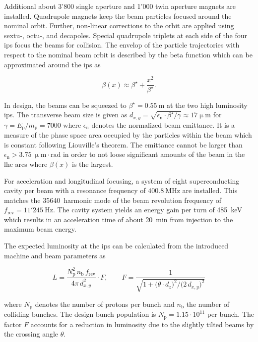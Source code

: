 Additional about 3'800 single aperture and 1'000 twin aperture magnets are installed. Quadrupole magnets keep the beam particles focused around the nominal orbit. Further, non-linear corrections to the orbit are applied using sextu-, octu-, and decapoles. Special quadrupole triplets at each side of the four \glspl{ip} focus the beams for collision. The envelop of the particle trajectories with respect to the nominal beam orbit is described by the beta function which can be approximated around the \glspl{ip} as 

\begin{equation}
\beta(x)\approx\beta^\star+\frac{x^2}{\beta^\star}.
\end{equation}

In design, the beams can be squeezed to $\beta^\star=0.55~\mathrm{m}$ at the two high luminosity \glspl{ip}. The transverse beam size is given as $d_{x,y}=\sqrt{\epsilon_\mathrm{n}\cdot\beta^\star/\gamma}\approx17\upmu\mathrm{m}$ for $\gamma=E_\mathrm{p}/m_\mathrm{p}=7000$ where $\epsilon_\mathrm{n}$ denotes the normalized beam emittance. It is a measure of the phase space area occupied by the particles within the beam which is constant following Liouville's theorem. The emittance cannot be larger than $\epsilon_\mathrm{n}>3.75~\upmu\mathrm{m}\cdot\mathrm{rad}$ in order to not loose significant amounts of the beam in the \gls{lhc} arcs where $\beta(x)$ is the largest.

For acceleration and longitudinal focusing, a system of eight superconducting cavity per beam with a resonance frequency of $400.8~\mathrm{MHz}$ are installed. This matches the 35640~harmonic mode of the beam revolution frequency of $f_\mathrm{rev}=11'245~\mathrm{Hz}$. The cavity system yields an energy gain per turn of 485~keV which results in an acceleration time of about 20~min from injection to the maximum beam energy.

The expected luminosity at the \glspl{ip} can be calculated from the introduced machine and beam parameters as

\begin{equation}
L=\frac{N_\mathrm{p}^{2}\,n_\mathrm{b}\,f_\mathrm{rev}}{4\pi\,d^2_{x,y}}\cdot F,\qquad F=\frac{1}{\sqrt{1+\big(\theta\cdot d_{z}\big)^2\big/\big({2\,d_{x,y}}\big)^2}}
\end{equation}

where $N_\mathrm{p}$ denotes the number of protons per bunch and $n_\mathrm{b}$ the number of colliding bunches. The design bunch population is $N_\mathrm{p}=1.15\cdot10^{11}$ per bunch. The factor $F$ accounts for a reduction in luminosity due to the slightly tilted beams by the crossing angle $\theta$.

